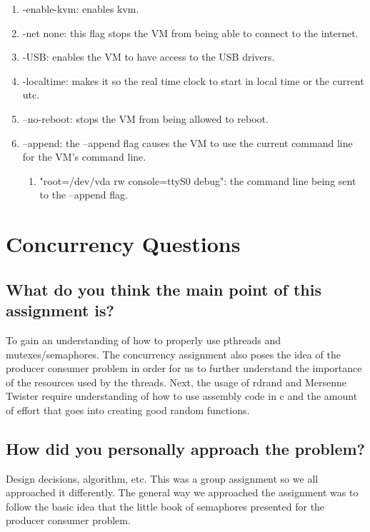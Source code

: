 \documentclass[onecolumn, draftclsnofoot,10pt, compsoc]{IEEEtran}
\begin{document}
\begin{enumerate}
    \item -enable-kvm: enables kvm.

    \item -net none: this flag stops the VM from being able to connect to the internet.

    \item -USB: enables the VM to have access to the USB drivers.

    \item -localtime: makes it so the real time clock to start in local time or the current utc.

    \item --no-reboot: stops the VM from being allowed to reboot.

    \item --append: the --append flag causes the VM to use the current command line for the VM’s command line.
    
    \begin{enumerate}
        \item "root=/dev/vda rw console=ttyS0 debug": the command line being sent to the --append flag.
    \end{enumerate}
    
\end{enumerate}

\section{Concurrency Questions}

\subsection{What do you think the main point of this assignment is?}

To gain an understanding of how to properly use pthreads and mutexes/semaphores. The concurrency assignment also poses the idea of the producer consumer problem in order for us to further understand the importance of the resources used by the threads. Next, the usage of rdrand and Mersenne Twister require understanding of how to use assembly code in c and the amount of effort that goes into creating good random functions.

\subsection{How did you personally approach the problem?}

Design decisions, algorithm, etc.
This was a group assignment so we all approached it differently. The general way we approached the assignment was to follow the basic idea that the little book of semaphores presented for the producer consumer problem.
\end{document}
